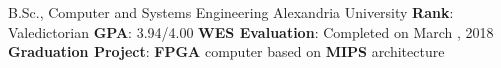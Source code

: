 \documentclass[letterpaper]{twentysecondcv} %
\begin{document}
\begin{twenty} %
               {B.Sc., Computer and Systems Engineering}
               {Alexandria University}
               {\textbf{Rank}: Valedictorian\newline
                \textbf{GPA}: 3.94/4.00\newline
                \textbf{WES Evaluation}: Completed on March , 2018\newline
                \textbf{Graduation Project}: \textbf{FPGA} computer based on \textbf{MIPS} architecture
               }
\end{twenty}



\end{document}

